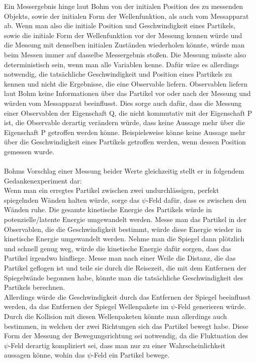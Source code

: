 Ein Messergebnis hinge laut Bohm von der initialen Position des zu messenden Objekts, sowie der initialen Form der Wellenfunktion, als auch vom Messapparat ab. Wenn man also die initiale Position und Geschwindigkeit eines Partikels, sowie die initiale Form der Wellenfunktion vor der Messung kennen würde und die Messung mit denselben initialen Zuständen wiederholen könnte, würde man beim Messen immer auf dasselbe Messergebnis stoßen. Die Messung müsste also deterministisch sein, wenn man alle Variablen kenne. Dafür wäre es allerdings notwendig, die tatsächliche Geschwindigkeit und Position eines Partikels zu kennen und nicht die Ergebnisse, die eine Observable liefern. Observablen liefern laut Bohm keine Informationen über das Partikel vor oder nach der Messung und würden vom Messapparat beeinflusst. Dies sorge auch dafür, dass die Messung einer Observablen der Eigenschaft Q, die nicht kommutativ mit der Eigenschaft P ist, die Observable derartig verändern würde, dass keine Aussage mehr über die Eigenschaft P getroffen werden könne. Beispielsweise könne keine Aussage mehr über die Geschwindigkeit eines Partikels getroffen werden, wenn dessen Position gemessen wurde.\\\\
Bohms Vorschlag einer Messung beider Werte gleichzeitig stellt er in folgendem Gedankenexperiment dar:\\
Wenn man ein erregtes Partikel zwischen zwei undurchlässigen, perfekt spiegelnden Wänden halten würde, sorge das $\psi$-Feld dafür, dass es zwischen den Wänden ruhe. Die gesamte kinetische Energie des Partikels würde in potenzielle/latente Energie umgewandelt werden. Messe man das Partikel in der Observablen, die die Geschwindigkeit bestimmt, würde diese Energie wieder in kinetische Energie umgewandelt werden. Nehme man die Spiegel dann plötzlich und schnell genug weg, würde die kinetische Energie dafür sorgen, dass das Partikel irgendwo hinfliege. Messe man nach einer Weile die Distanz, die das Partikel geflogen ist und teile sie durch die Reisezeit, die mit dem Entfernen der Spiegelwände begonnen habe, könnte man die tatsächliche Geschwindigkeit des Partikels berechnen. \\Allerdings würde die Geschwindigkeit durch das Entfernen der Spiegel beeinflusst werden, da das Entfernen der Spiegel Wellenpakete im $\psi$-Feld  generieren würde. Durch die Kollision mit diesen Wellenpaketen könnte man allerdings auch bestimmen, in welchen der zwei Richtungen sich das Partikel bewegt habe. Diese Form der Messung der Bewegungsrichtung sei notwendig, da die Fluktuation des $\psi$-Feld derartig kompliziert sei, dass man nur zu einer Wahrscheinlichkeit aussagen könne, wohin das $\psi$-Feld ein Partikel bewege.
